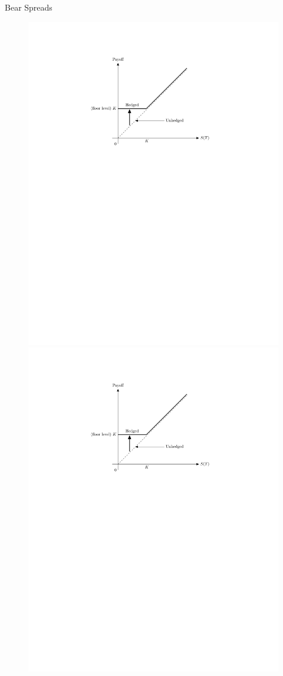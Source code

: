 \documentclass[10pt,handout]{beamer}
\theoremstyle{definition}
\begin{document}
\begin{frame}{Bear Spreads}
\begin{figure}[!htbp]
    \includegraphics[scale=0.75,page=7]{fig/note08/lo.pdf}
    \includegraphics[scale=0.75,page=8]{fig/note08/lo.pdf}

\end{figure}
\end{frame}
\end{document}
